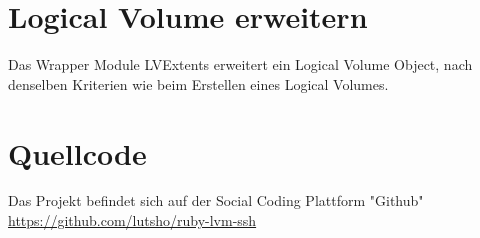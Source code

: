 \section{Logical Volume erweitern}
Das Wrapper Module LVExtents erweitert ein Logical Volume Object, nach denselben Kriterien wie beim Erstellen eines Logical Volumes.

\lstset{language=Ruby, basicstyle=\footnotesize, showstringspaces=false, tabsize=2}


\section{Quellcode}
Das Projekt befindet sich auf der Social Coding Plattform "Github" 
\url{https://github.com/lutsho/ruby-lvm-ssh}


